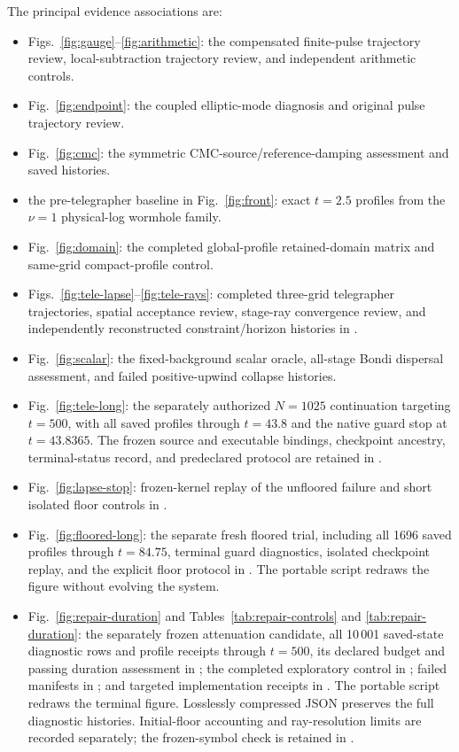 The principal evidence associations are:
\begin{itemize}
 \item Figs.~\ref{fig:gauge}--\ref{fig:arithmetic}: the compensated finite-pulse trajectory review, local-subtraction trajectory review, and independent arithmetic controls.
 \item Fig.~\ref{fig:endpoint}: the coupled elliptic-mode diagnosis and original pulse trajectory review.
 \item Fig.~\ref{fig:cmc}: the symmetric CMC-source/reference-damping assessment and saved histories.
 \item the pre-telegrapher baseline in Fig.~\ref{fig:front}: exact $t=2.5$ profiles from the $\nu=1$ physical-log wormhole family.
 \item Fig.~\ref{fig:domain}: the completed global-profile retained-domain matrix and same-grid compact-profile control.
 \item Figs.~\ref{fig:tele-lapse}--\ref{fig:tele-rays}: completed three-grid telegrapher trajectories, spatial acceptance review, stage-ray convergence review, and independently reconstructed constraint/horizon histories in .
 \item Fig.~\ref{fig:scalar}: the fixed-background scalar oracle, all-stage Bondi dispersal assessment, and failed positive-upwind collapse histories.
 \item Fig.~\ref{fig:tele-long}: the separately authorized $N=1025$ continuation targeting $t=500$, with all saved profiles through $t=43.8$ and the native guard stop at $t=43.8365$. The frozen source and executable bindings, checkpoint ancestry, terminal-status record, and predeclared protocol are retained in .
 \item Fig.~\ref{fig:lapse-stop}: frozen-kernel replay of the unfloored failure and short isolated floor controls in .
 \item Fig.~\ref{fig:floored-long}: the separate fresh floored trial, including all 1696 saved profiles through $t=84.75$, terminal guard diagnostics, isolated checkpoint replay, and the explicit floor protocol in . The portable  script redraws the figure without evolving the system.
 \item Fig.~\ref{fig:repair-duration} and Tables~\ref{tab:repair-controls} and \ref{tab:repair-duration}: the separately frozen attenuation candidate, all 10\,001 saved-state diagnostic rows and profile receipts through $t=500$, its declared budget and passing duration assessment in ; the completed exploratory control in ; failed manifests in ; and targeted implementation receipts in . The portable  script redraws the terminal figure. Losslessly compressed JSON preserves the full diagnostic histories. Initial-floor accounting and ray-resolution limits are recorded separately; the frozen-symbol check is retained in .
\end{itemize}
